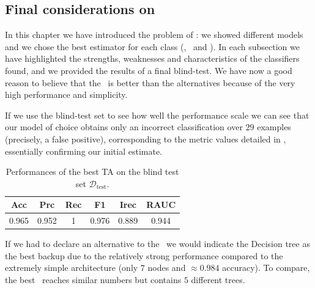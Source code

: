 \subsection{Final considerations on \qrp}
In this chapter we have introduced the problem of \qrp: we showed different models and we
chose the best estimator for each class (\dt, \rf\ and \ta). In each subsection we have
highlighted the strengths, weaknesses and characteristics of the classifiers found, and we provided the
results of a final blind-test. We have now a good reason to believe that the \ta\ is better than the
alternatives because of the very high performance and simplicity.

If we use the blind-test set to see how well the performance scale we can see that our model of
choice obtains only an incorrect classification over $29$ examples (precisely, a false positive), corresponding to the metric values detailed in , essentially confirming our initial estimate.

\begin{table}[!ht]
	\caption{Performances of the best TA on the blind test set $\mathscr
			D_\mathrm{test}$.}\label{tbl:qrp-ta-test}

	\setlength{\tabcolsep}{6pt}
	\centering
	\begin{tabular}{cccccc}
		\toprule
		\textbf{Acc} & \textbf{Prc} & \textbf{Rec} & \textbf{F1} & \textbf{Irec} & \textbf{RAUC} \\
		\midrule
		0.965        & 0.952        & 1            & 0.976       & 0.889         & 0.944         \\
		\bottomrule
	\end{tabular}
\end{table}

If we had to declare an alternative to the \ta\ we would indicate the Decision tree as the best backup due to
the relatively strong performance compared to the extremely simple architecture (only $7$ nodes and
$\approx 0.984$ accuracy). To compare, the best \rf\ reaches similar numbers but contains $5$
different trees.







